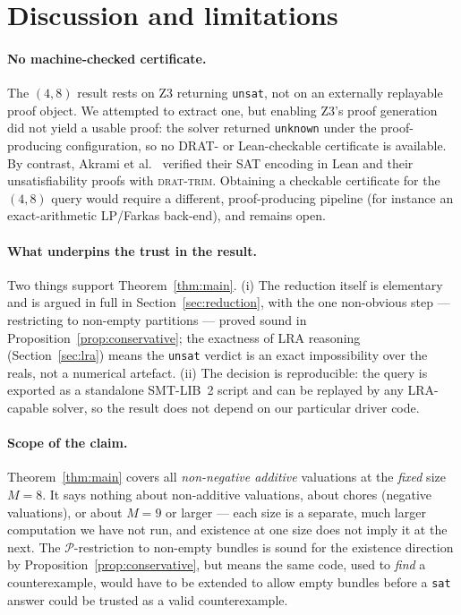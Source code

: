 \documentclass[11pt,a4paper]{article}
\theoremstyle{definition}
\theoremstyle{plain}
\newcommand{\goods}{M}
\begin{document}
\section{Discussion and limitations}
\label{sec:discussion}

\paragraph{No machine-checked certificate.}
The $(4,8)$ result rests on Z3 returning \texttt{unsat}, not on an externally
replayable proof object. We attempted to extract one, but enabling Z3's proof
generation did not yield a usable proof: the solver returned \texttt{unknown}
under the proof-producing configuration, so no DRAT- or Lean-checkable certificate
is available. By contrast, Akrami et al.\ \cite{AkramiEtAl2026} verified their SAT
encoding in Lean and their unsatisfiability proofs with \textsc{drat-trim}.
Obtaining a checkable certificate for the $(4,8)$ query would require a different,
proof-producing pipeline (for instance an exact-arithmetic LP/Farkas back-end),
and remains open.

\paragraph{What underpins the trust in the result.}
Two things support Theorem~\ref{thm:main}. (i) The reduction itself is
elementary and is argued in full in Section~\ref{sec:reduction}, with the one
non-obvious step --- restricting to non-empty partitions --- proved sound in
Proposition~\ref{prop:conservative}; the exactness of LRA reasoning
(Section~\ref{sec:lra}) means the \texttt{unsat} verdict is an exact
impossibility over the reals, not a numerical artefact. (ii) The decision is
reproducible: the query is exported as a standalone SMT-LIB~2 script and can be
replayed by any LRA-capable solver, so the result does not depend on our
particular driver code.

\paragraph{Scope of the claim.}
Theorem~\ref{thm:main} covers all
\emph{non-negative additive} valuations at the \emph{fixed} size $\goods=8$. It
says nothing about non-additive valuations, about chores (negative valuations), or
about $\goods=9$ or larger --- each size is a separate, much larger computation we
have not run, and existence at one size does not imply it at the next. The
$\mathcal{P}$-restriction to non-empty bundles
is sound for the existence direction by Proposition~\ref{prop:conservative}, but
means the same code, used to \emph{find} a counterexample, would have to be
extended to allow empty bundles before a \texttt{sat} answer could be trusted as
a valid counterexample.
\end{document}
